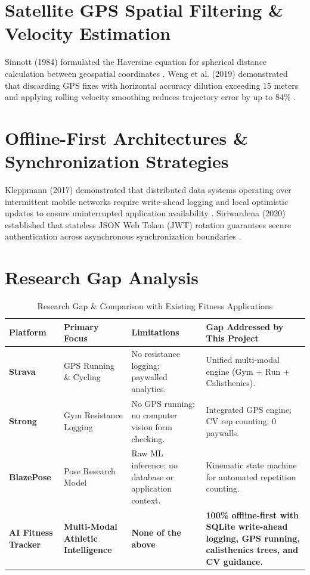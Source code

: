 \documentclass[12pt,a4paper]{report}
\begin{document}
\section{Satellite GPS Spatial Filtering \& Velocity Estimation}
Sinnott (1984) formulated the Haversine equation for spherical distance calculation between geospatial coordinates \cite{haversine}. Weng et al. (2019) demonstrated that discarding GPS fixes with horizontal accuracy dilution exceeding 15 meters and applying rolling velocity smoothing reduces trajectory error by up to 84\% \cite{weng}.

\section{Offline-First Architectures \& Synchronization Strategies}
Kleppmann (2017) demonstrated that distributed data systems operating over intermittent mobile networks require write-ahead logging and local optimistic updates to ensure uninterrupted application availability \cite{kleppmann}. Siriwardena (2020) established that stateless JSON Web Token (JWT) rotation guarantees secure authentication across asynchronous synchronization boundaries \cite{security}.

\section{Research Gap Analysis}
\begin{table}[htbp]
\centering
\small
\renewcommand{\arraystretch}{1.25}
\begin{tabularx}{\textwidth}{|l|p{3.2cm}|p{3.4cm}|X|}
\hline
\textbf{Platform} & \textbf{Primary Focus} & \textbf{Limitations} & \textbf{Gap Addressed by This Project} \\
\hline
\textbf{Strava} & GPS Running \& Cycling & No resistance logging; paywalled analytics. & Unified multi-modal engine (Gym + Run + Calisthenics). \\
\hline
\textbf{Strong} & Gym Resistance Logging & No GPS running; no computer vision form checking. & Integrated GPS engine; CV rep counting; 0 paywalls. \\
\hline
\textbf{BlazePose} & Pose Research Model & Raw ML inference; no database or application context. & Kinematic state machine for automated repetition counting. \\
\hline
\textbf{AI Fitness Tracker} & \textbf{Multi-Modal Athletic Intelligence} & \textbf{None of the above} & \textbf{100\% offline-first with SQLite write-ahead logging, GPS running, calisthenics trees, and CV guidance.} \\
\hline
\end{tabularx}
\caption{Research Gap \& Comparison with Existing Fitness Applications}
\label{tab:gap_analysis}
\end{table}
\end{document}
